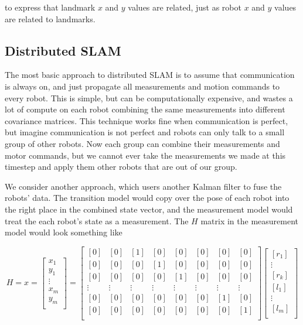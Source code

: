 \documentclass[prodmode,acmtecs]{acmsmall} %
\begin{document}
to express that landmark $x$ and $y$ values are related, just as robot $x$ and $y$ values are related to landmarks.

\subsection{Distributed SLAM}

The most basic approach to distributed SLAM is to assume that communication is always on, and just propagate all measurements and motion commands to every robot. This is simple, but can be computationally expensive, and wastes a lot of compute on each robot combining the same measurements into different covariance matrices. This technique works fine when communication is perfect, but imagine communication is not perfect and robots can only talk to a small group of other robots. Now each group can combine their measurements and motor commands, but we cannot ever take the measurements we made at this timestep and apply them other robots that are out of our group.

We consider another approach, which users another Kalman filter to fuse the robots' data. The transition model would copy over the pose of each robot into the right place in the combined state vector, and the measurement model would treat the each robot's state as a measurement. The $H$ matrix in the measurement model would look something like

$$
H
=
x 
= 
\begin{bmatrix}
    x_1    \\
    y_1    \\
    \vdots \\
    x_m    \\
    y_m    \\
\end{bmatrix}
=
\begin{bmatrix}
    [ 0 ]  & [ 0 ]  & [ 1 ] & [ 0 ] & [ 0 ]  & [ 0 ]  & [ 0 ]  & [ 0 ] \\
    [ 0 ]  & [ 0 ]  & [ 0 ] & [ 1 ] & [ 0 ]  & [ 0 ]  & [ 0 ]  & [ 0 ] \\
    [ 0 ]  & [ 0 ]  & [ 0 ] & [ 0 ] & [ 1 ]  & [ 0 ]  & [ 0 ]  & [ 0 ] \\
    \vdots & \vdots & \vdots & \vdots & \vdots & \vdots & \vdots & \vdots \\
    [ 0 ]  & [ 0 ]  & [ 0 ] & [ 0 ] & [ 0 ]  & [ 0 ]  & [ 1 ]  & [ 0 ] \\
    [ 0 ]  & [ 0 ]  & [ 0 ] & [ 0 ] & [ 0 ]  & [ 0 ]  & [ 0 ]  & [ 1 ] \\
\end{bmatrix}                 
\begin{bmatrix}
    [ r_1 ] \\
    \vdots \\
    [ r_k ] \\
    [ l_1 ] \\
    \vdots \\
    [ l_m ] \\
\end{bmatrix}
$$
\end{document}
